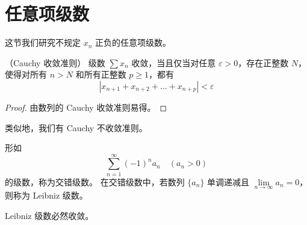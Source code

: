 \section{任意项级数}
这节我们研究不规定 $x_n$ 正负的任意项级数。
\begin{proposition}
	（Cauchy 收敛准则）
	级数 $\sum x_n$ 收敛，当且仅当对任意 $\varepsilon > 0$，存在正整数 $N$，使得对所有 $n > N$ 和所有正整数 $p \ge 1$，都有
	\[
	|x_{n+1} + x_{n+2} + \dots + x_{n+p}| < \varepsilon
	\]
\end{proposition}
\begin{proof}
	由数列的 Cauchy 收敛准则易得。
\end{proof}

类似地，我们有 Cauchy 不收敛准则。

\begin{definition}
	形如
	\[
	\sum_{n=1}^{\infty} (-1)^n a_n \quad (a_n > 0)
	\]
	的级数，称为交错级数。
	在交错级数中，若数列 $\{a_n\}$ 单调递减且 $\lim\limits_{n \to \infty} a_n = 0$，则称为 Leibniz 级数。
\end{definition}
\begin{proposition}\label{Leibniz 级数必然收敛。}
	Leibniz 级数必然收敛。
\end{proposition}

